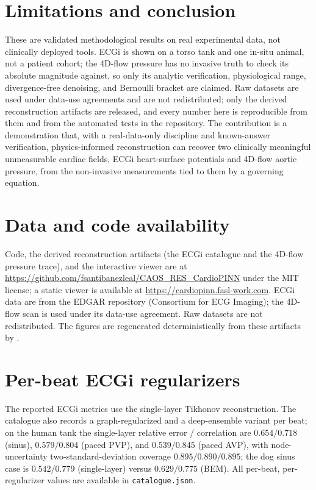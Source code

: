 \documentclass[journal]{IEEEtran}
\begin{document}
\section{Limitations and conclusion}

These are validated methodological results on real experimental data, not clinically deployed
tools. ECGi is shown on a torso tank and one in-situ animal, not a patient cohort; the 4D-flow
pressure has no invasive truth to check its absolute magnitude against, so only its analytic
verification, physiological range, divergence-free denoising, and Bernoulli bracket are claimed.
Raw datasets are used under data-use agreements and are not redistributed; only the derived
reconstruction artifacts are released, and every number here is reproducible from them and from
the automated tests in the repository. The contribution is a demonstration that, with a
real-data-only discipline and known-answer verification, physics-informed reconstruction can
recover two clinically meaningful unmeasurable cardiac fields, ECGi heart-surface potentials and
4D-flow aortic pressure, from the non-invasive measurements tied to them by a governing equation.

\section*{Data and code availability}

{\raggedright
Code, the derived reconstruction artifacts (the ECGi catalogue and the 4D-flow pressure trace),
and the interactive viewer are at \url{https://github.com/fsantibanezleal/CAOS_RES_CardioPINN}
under the MIT license; a static viewer is available at \url{https://cardiopinn.fasl-work.com}.
ECGi data are from the EDGAR repository (Consortium for ECG Imaging); the 4D-flow scan is used
under its data-use agreement. Raw datasets are not redistributed. The figures are regenerated
deterministically from these artifacts by
.\par}

\appendices
\section{Per-beat ECGi regularizers}
The reported ECGi metrics use the single-layer Tikhonov reconstruction. The catalogue also
records a graph-regularized and a deep-ensemble variant per beat; on the human tank the
single-layer relative error / correlation are $0.654/0.718$ (sinus), $0.579/0.804$ (paced PVP),
and $0.539/0.845$ (paced AVP), with node-uncertainty two-standard-deviation coverage
$0.895/0.890/0.895$; the dog sinus case is $0.542/0.779$ (single-layer) versus $0.629/0.775$
(BEM). All per-beat, per-regularizer values are available in \texttt{catalogue.json}.
\end{document}
